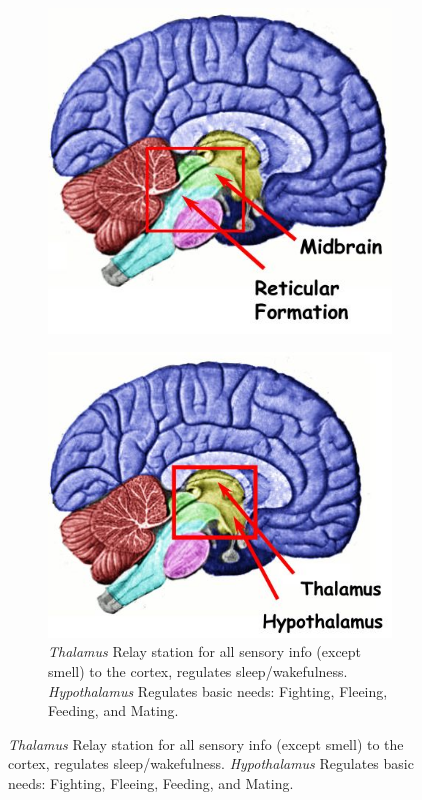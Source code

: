\documentclass[]{article}
\begin{document}
\begin{figure}[H]
\begin{subfigure}[b]{0.45\textwidth}
		\includegraphics[width=\textwidth]{midbrain}
	\end{subfigure}
	\begin{subfigure}[b]{0.45\textwidth}
		\caption{\emph{Thalamus} Relay station for all 	sensory info (except 	smell) to the cortex, regulates sleep/wakefulness.
		\emph{Hypothalamus} Regulates basic needs: 	Fighting, Fleeing, 	Feeding, and Mating.}
		\includegraphics[width=\textwidth]{thalamus}

\end{subfigure}
\end{figure}
\end{document}
